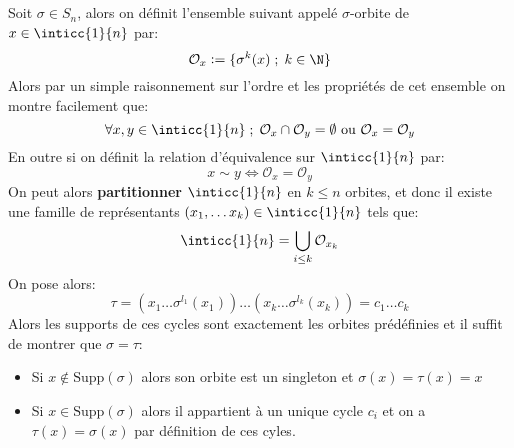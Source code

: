 \documentclass{report}
\begin{document}
      \subsection*{}
         Soit \(\sigma \in S_n\), alors on définit l'ensemble suivant appelé $\sigma$-orbite de \(x \in \inticc{1}{n}\) par:
         \[
            \mathcal{O}_x := \{\sigma^k(x)\; ; \; k \in \N\}
         \]
         Alors par un simple raisonnement sur l'ordre et les propriétés de cet ensemble on montre facilement que:
         \[
            \forall x, y \in \inticc{1}{n} \; ; \; \mathcal{O}_x \cap \mathcal{O}_y = \emptyset \text{ ou } \mathcal{O}_x = \mathcal{O}_y
         \]
         En outre si on définit la relation d'équivalence sur \(\inticc{1}{n}\) par:
         \[
            x \sim y \Longleftrightarrow \mathcal{O}_x = \mathcal{O}_y
         \]
         On peut alors \textbf{partitionner} \(\inticc{1}{n}\) en \(k \leq n\) orbites, et donc il existe une famille de représentants \((x_1, \ldots x_k) \in \inticc{1}{n}\) tels que:
         \[
            \inticc{1}{n} = \bigcup_{i \leq k} \mathcal{O}_{x_k}
         \]
         On pose alors:
         \[
            \tau = (x_1 \dots \sigma^{l_1}(x_1))\ldots(x_k \dots \sigma^{l_k}(x_k)) = c_1\ldots c_k
         \]
         Alors les supports de ces cycles sont exactement les orbites prédéfinies et il suffit de montrer que \(\sigma = \tau\):
         \begin{itemize}
            \item Si \(x \notin \text{Supp}(\sigma)\) alors son orbite est un singleton et \(\sigma(x) = \tau(x) = x\)
            \item Si \(x \in \text{Supp}(\sigma)\) alors il appartient à un unique cycle \(c_i\) et on a \(\tau(x) = \sigma(x)\) par définition de ces cyles.
         \end{itemize}
         \pagebreak     
\end{document}
